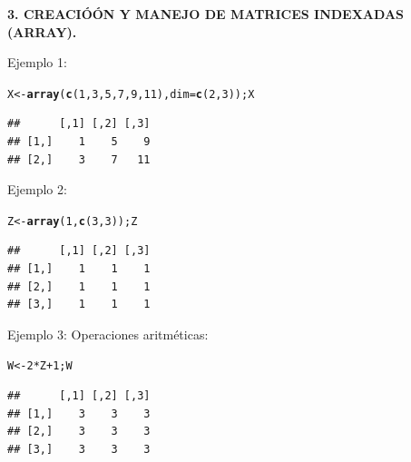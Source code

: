 \documentclass[12pt,letterpaper]{article}\usepackage[]{graphicx}\usepackage[]{color}
\makeatletter
\newcommand{\hlnum}[1]{\textcolor[rgb]{0.686,0.059,0.569}{#1}}%
\newcommand{\hlopt}[1]{\textcolor[rgb]{0,0,0}{#1}}%
\newcommand{\hlstd}[1]{\textcolor[rgb]{0.345,0.345,0.345}{#1}}%
\newcommand{\hlkwb}[1]{\textcolor[rgb]{0.69,0.353,0.396}{#1}}%
\newcommand{\hlkwc}[1]{\textcolor[rgb]{0.333,0.667,0.333}{#1}}%
\newcommand{\hlkwd}[1]{\textcolor[rgb]{0.737,0.353,0.396}{\textbf{#1}}}%
\newenvironment{kframe}{%
 \def\at@end@of@kframe{}%
 \ifinner\ifhmode%
  \def\at@end@of@kframe{\end{minipage}}%
  \begin{minipage}{\columnwidth}%
 \fi\fi%
 \def\FrameCommand##1{\hskip\@totalleftmargin \hskip-\fboxsep
 \colorbox{shadecolor}{##1}\hskip-\fboxsep
     \hskip-\linewidth \hskip-\@totalleftmargin \hskip\columnwidth}%
 \MakeFramed {\advance\hsize-\width
   \@totalleftmargin\z@ \linewidth\hsize
   \@setminipage}}%
 {\par\unskip\endMakeFramed%
 \at@end@of@kframe}
\newenvironment{knitrout}{}{} %
\makeatother
\begin{document}
\begin{center}
\textbf{3.  CREACIÓ\'ON Y MANEJO DE MATRICES INDEXADAS (ARRAY).}
\end{center}

Ejemplo 1:
\begin{knitrout}
\color{fgcolor}\begin{kframe}
\begin{alltt}
\hlstd{X} \hlkwb{<-} \hlkwd{array}\hlstd{(}\hlkwd{c}\hlstd{(}\hlnum{1}\hlstd{,} \hlnum{3}\hlstd{,} \hlnum{5}\hlstd{,} \hlnum{7}\hlstd{,} \hlnum{9}\hlstd{,} \hlnum{11}\hlstd{),} \hlkwc{dim}\hlstd{=}\hlkwd{c}\hlstd{(}\hlnum{2}\hlstd{,} \hlnum{3}\hlstd{)); X}
\end{alltt}
\begin{verbatim}
##      [,1] [,2] [,3]
## [1,]    1    5    9
## [2,]    3    7   11
\end{verbatim}
\end{kframe}
\end{knitrout}

Ejemplo 2:
\begin{knitrout}
\color{fgcolor}\begin{kframe}
\begin{alltt}
\hlstd{Z} \hlkwb{<-} \hlkwd{array}\hlstd{(}\hlnum{1}\hlstd{,} \hlkwd{c}\hlstd{(}\hlnum{3}\hlstd{,} \hlnum{3}\hlstd{)); Z}
\end{alltt}
\begin{verbatim}
##      [,1] [,2] [,3]
## [1,]    1    1    1
## [2,]    1    1    1
## [3,]    1    1    1
\end{verbatim}
\end{kframe}
\end{knitrout}

Ejemplo 3: Operaciones aritm\'eticas:
\begin{knitrout}
\color{fgcolor}\begin{kframe}
\begin{alltt}
\hlstd{W} \hlkwb{<-} \hlnum{2}\hlopt{*}\hlstd{Z}\hlopt{+}\hlnum{1}\hlstd{; W}
\end{alltt}
\begin{verbatim}
##      [,1] [,2] [,3]
## [1,]    3    3    3
## [2,]    3    3    3
## [3,]    3    3    3
\end{verbatim}
\end{kframe}
\end{knitrout}
\end{document}
